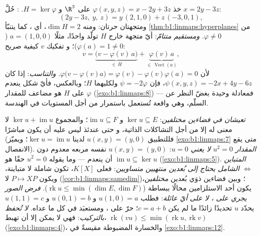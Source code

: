 \begin{example}
\label{ex:b1:linmaps:hyperplanerun}
خذ $\varphi(x, y, z) = x - 2y + 3z$ على $\R^3$ و $H =
\ker\varphi$. \emph{}: حُلَّ $x = 2y - 3z$:
\[
(2y - 3z,\ y,\ z) = y\,(2, 1, 0) + z\,(-3, 0, 1),
\]
ومتجهتان حرتان: ومنه $\dim H = 2$، أي ، كما
يتنبّأ \cref{thm:b1:linmaps:hyperplanes} من $\varphi \neq
0$. \emph{ومستقيم متتامّ}: أيّ متجهة خارج $H$ تولّد واحدًا،
مثلًا $a = (1, 0, 0)$ ($\varphi(a) = 1 \neq 0$)؛ و
تفكيك $v$ كيفية صريح:
\[
v = \underbrace{\bigl(v - \varphi(v)\,a\bigr)}_{\in\,H}
+ \underbrace{\varphi(v)\,a}_{\in\,\operatorname{Vect}(a)},
\]
لأن $\varphi\bigl(v - \varphi(v)a\bigr) = \varphi(v) -
\varphi(v)\varphi(a) = 0$. \emph{والتناسب}: إذا كان $\psi(x,y,z)
= -2x + 4y - 6z$، فإن $\psi = -2\varphi$ ولكليهما 
$H$؛ وبالعكس، فأيّ شكل ينعدم على $H$ هو مضاعف للمقدار
$\varphi$ (\cref{exo:b1:linmaps:8}) --- فمعادلة
 وحيدة بغضّ النظر عن السلّم، وهي واقعة تُستعمل باستمرار من أجل
المستويات في الهندسة.
\end{example}

\begin{remark}
\label{rem:b1:linmaps:pitfalls}
\emph{  تعيشان في فضاءين مختلفين}: $\ker u
\subseteq E$ و $\operatorname{im} u \subseteq F$؛ والمجموع $\ker u
+ \operatorname{im} u$ لا معنى له إلا من أجل التشاكلات الذاتية، و
حتى عندئذ ليس عليه أن يكون مباشرًا (فللتطبيق $u(x, y) = (y, 0)$ لدينا $\ker u
= \operatorname{im} u$؛ ويميّز \cref{exo:b1:linmaps:7}
متى يقع الانفصال).
\emph{المقدار $u^2 = 0$ لا يعني $u = 0$}:  $u(x,y) =
(y, 0)$ نفسه مربعه معدوم دون أن ينعدم --- وما يقوله $u^2 = 0$
حقًا هو $\operatorname{im} u \subseteq \ker u$
(\cref{exo:b1:linmaps:5}).
\emph{المتباين $\iff$ الشامل يحتاج إلى بُعدين منتهيين
متساويين}: فعلى $K[X]$، تكون  شاملة لا
متباينة، ويكون $P \mapsto XP$  لا 
(\cref{cor:b1:linmaps:samedim})؛ وبين فضاءين ذوَي بُعدين
\emph{مختلفين}، يكون أحد الاستلزامين محالًا ببساطة
($\operatorname{rk} u \leq \min(\dim E, \dim F)$).
\emph{فرض الصور يجري على ، لا على أيّ عائلة}:
فطلب $u(1, 0) = a$ و $u(0, 1) = b$ و $u(1, 1) = c$
يحدّد $u$ تحديدًا زائدًا ما لم يكن $c = a + b$؛  حرّ على
، ومستعبَد في كل ما عداه.
\emph{ لا تُحفظ بالتركيب}: فهي لا يمكن إلا أن تهبط،
$\operatorname{rk}(vu) \leq \min(\operatorname{rk} u,
\operatorname{rk} v)$ (\cref{exo:b1:linmaps:4})، والخسارة المضبوطة
مقيسةٌ في \cref{exo:b1:linmaps:12}.
\end{remark}

